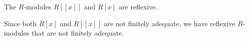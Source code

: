\begin{corollary}
  The $R$-modules $R[[x]]$ and $R[x]$ are reflexive.
\end{corollary}

Since both $R[x]$ and $R[[x]]$ are not finitely adequate, we have reflexive $R$-modules that are not finitely adequate.



